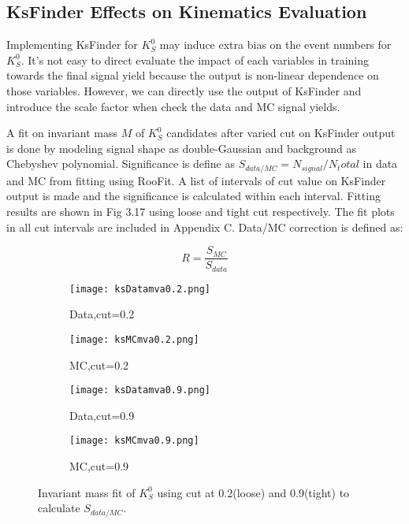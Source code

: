\subsection{KsFinder Effects on Kinematics Evaluation}
Implementing KsFinder for $K_S^0$ may induce extra bias on the event numbers for $K_S^0$. It's not easy to direct evaluate the impact of each variables in training towards the final signal yield because the output is non-linear dependence on those variables. However, we can directly use the output of KsFinder and introduce the scale factor when check the data and MC signal yields. 
 
A fit on invariant mass $M$ of $K_S^0$ candidates after varied cut on KsFinder output is done by modeling signal shape as double-Gaussian and background as Chebyshev polynomial. Significance is define as $S_{data/MC} = N_{signal} /N_total$ in data and MC from fitting using RooFit. A list of intervals of cut value on KsFinder output is made and the significance is calculated within each interval. Fitting results are shown in Fig 3.17 using loose and tight cut respectively. The fit plots in all cut intervals are included in Appendix C.  Data/MC correction is defined as:

\begin{equation}
	R = \frac{S_{MC}}{S_{data}}
\end{equation}



\begin{figure}[htpb]
	\begin{subfigure}{0.5\linewidth}
		\caption{Data,cut=0.2}
		\texttt{[image: ksDatamva0.2.png]}
	\end{subfigure}
\begin{subfigure}{0.5\linewidth}
	\caption{MC,cut=0.2}
	\texttt{[image: ksMCmva0.2.png]}
\end{subfigure}

\begin{subfigure}{0.5\linewidth}
	\caption{Data,cut=0.9}
	\texttt{[image: ksDatamva0.9.png]}
\end{subfigure}
\begin{subfigure}{0.5\linewidth}
	\caption{MC,cut=0.9}
	\texttt{[image: ksMCmva0.9.png]}
\end{subfigure}
\caption{Invariant mass fit of $K_S^0$ using cut at 0.2(loose) and 0.9(tight) to calculate $S_{data/MC}$.}
\end{figure}

